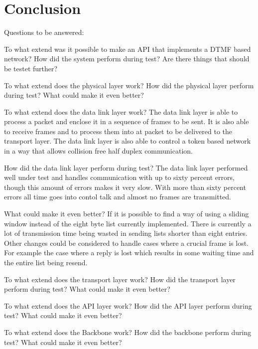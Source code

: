 \chapter{Conclusion}\label{chap:conclusion}
Questions to be answered:

To what extend was it possible to make an API that implements a DTMF based
network?
How did the system perform during test? 
Are there things that should be testet further?

To what extend does the physical layer work? 
How did the physical layer perform during test?
What could make it even better?

  To what extend does the data link layer work? 
The data link layer is able to process a packet and enclose it in a sequence of
frames to be sent. It is also able to receive frames and to process them into at
packet to be delivered to the transport layer. The data link layer is also able
to control a token based network in a way that allows collision free half duplex
communication. 

  How did the data link layer perform during test? The data link
layer performed well under test and handles communication with up to sixty
percent errors, though this amount of errors makes it very slow. With more than
sixty percent errors all time goes into contol talk and almost no frames are
transmitted.

  What could make it even better?
If it is possible to find a way of using a sliding window instead of the eight
byte list currently implemented. There is currently a lot of transmission time
being wasted in sending lists shorter than eight entries. Other changes could be
considered to handle cases where a crucial frame is lost. For example the case
where a reply is lost which results in some waiting time and the entire list
being resend.

To what extend does the transport layer work? 
How did the transport layer perform during test?
What could make it even better?

To what extend does the API layer work? 
How did the API layer perform during test?
What could make it even better?

To what extend does the Backbone work? 
How did the backbone perform during test?
What could make it even better?


